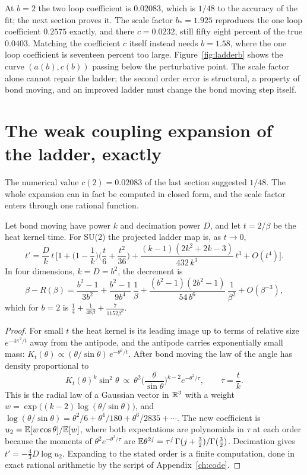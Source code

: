 At $b=2$ the two loop coefficient is $0.02083$, which is $1/48$ to the accuracy of the fit; the next section proves it. The scale factor $b_*=1.925$ reproduces the one loop coefficient $0.2575$ exactly, and there $c=0.0232$, still fifty eight percent of the true $0.0403$. Matching the coefficient $c$ itself instead needs $b=1.58$, where the one loop coefficient is seventeen percent too large. Figure~\ref{fig:ladderb} shows the curve $(a(b),c(b))$ passing below the perturbative point. The scale factor alone cannot repair the ladder; the second order error is structural, a property of bond moving, and an improved ladder must change the bond moving step itself.

\section{The weak coupling expansion of the ladder, exactly}

The numerical value $c(2)=0.02083$ of the last section suggested $1/48$. The whole expansion can in fact be computed in closed form, and the scale factor enters through one rational function.

\begin{theorem}\label{thm:expansion}
Let bond moving have power $k$ and decimation power $D$, and let $t=2/\beta$ be the heat kernel time. For SU(2) the projected ladder map is, as $t\to0$,
\[
t'=\frac{D}{k}\,t\,\Big[1+\Big(1-\frac1k\Big)\Big(\frac t6+\frac{t^2}{36}\Big)+\frac{(k-1)(2k^2+2k-3)}{432\,k^3}\,t^3+O(t^4)\Big].
\]
In four dimensions, $k=D=b^2$, the decrement is
\[
\beta-R(\beta)=\frac{b^2-1}{3b^2}+\frac{b^2-1}{9b^4}\,\frac1\beta+\frac{(b^2-1)(2b^2-1)}{54\,b^6}\,\frac1{\beta^2}+O(\beta^{-3}),
\]
which for $b=2$ is $\frac14+\frac{1}{48\beta}+\frac{7}{1152\beta^2}$.
\end{theorem}

\begin{proof}
For small $t$ the heat kernel is its leading image up to terms of relative size $e^{-4\pi^2/t}$ away from the antipode, and the antipode carries exponentially small mass: $K_t(\theta)\propto(\theta/\sin\theta)\,e^{-\theta^2/t}$. After bond moving the law of the angle has density proportional to
\[
K_t(\theta)^k\sin^2\theta\ \propto\ \theta^2\Big(\frac{\theta}{\sin\theta}\Big)^{k-2}e^{-\theta^2/\tau},\qquad\tau=\frac tk .
\]
This is the radial law of a Gaussian vector in $\mathbb{R}^3$ with a weight $w=\exp\big((k-2)\log(\theta/\sin\theta)\big)$, and $\log(\theta/\sin\theta)=\theta^2/6+\theta^4/180+\theta^6/2835+\cdots$. The new coefficient is $u_2=\mathbb{E}[w\cos\theta]/\mathbb{E}[w]$, where both expectations are polynomials in $\tau$ at each order because the moments of $\theta^2e^{-\theta^2/\tau}$ are $\mathbb{E}\theta^{2j}=\tau^j\,\Gamma(j+\frac32)/\Gamma(\frac32)$. Decimation gives $t'=-\frac43D\log u_2$. Expanding to the stated order is a finite computation, done in exact rational arithmetic by the script of Appendix~\ref{ch:code}.
\end{proof}

